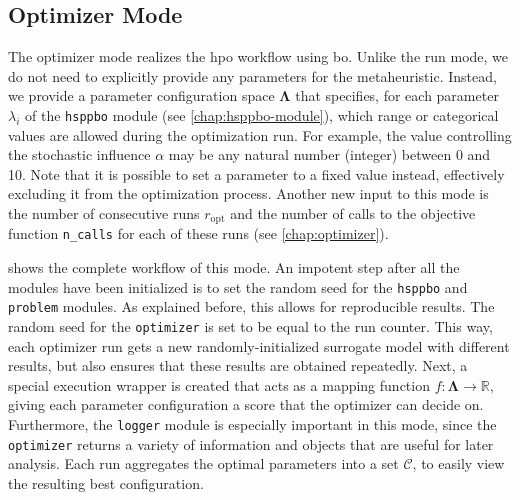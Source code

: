\subsection{Optimizer Mode}
\label{chap:opt-mode}

The optimizer mode realizes the \glsdesc{hpo} workflow using \glsdesc{bo}. Unlike the run mode, we do not need to explicitly provide any parameters for the metaheuristic. Instead, we provide a parameter configuration space $\mathbf{\Lambda}$ that specifies, for each parameter $\lambda_i$ of the \texttt{hsppbo} module (see \cref{chap:hsppbo-module}), which range or categorical values are allowed during the optimization run. For example, the value controlling the stochastic influence $\alpha$ may be any natural number (integer) between 0 and 10. Note that it is possible to set a parameter to a fixed value instead, effectively excluding it from the optimization process. Another new input to this mode is the number of consecutive runs $r_{\text{opt}}$ and the number of calls to the objective function \texttt{n\_calls} for each of these runs (see \cref{chap:optimizer}).

 shows the complete workflow of this mode. An impotent step after all the modules have been initialized is to set the random seed for the \texttt{hsppbo} and \texttt{problem} modules. As explained before, this allows for reproducible results. The random seed for the \texttt{optimizer} is set to be equal to the run counter. This way, each optimizer run gets a new randomly-initialized surrogate model with different results, but also ensures that these results are obtained repeatedly. Next, a special execution wrapper is created that acts as a mapping function $f: \mathcal{\mathbf{\Lambda}} \to \mathbb{R}$, giving each parameter configuration a score that the optimizer can decide on. Furthermore, the \texttt{logger} module is especially important in this mode, since the \texttt{optimizer} returns a variety of information and objects that are useful for later analysis. Each run aggregates the optimal parameters into a set $\mathcal{C}$, to easily view the resulting best configuration. 

